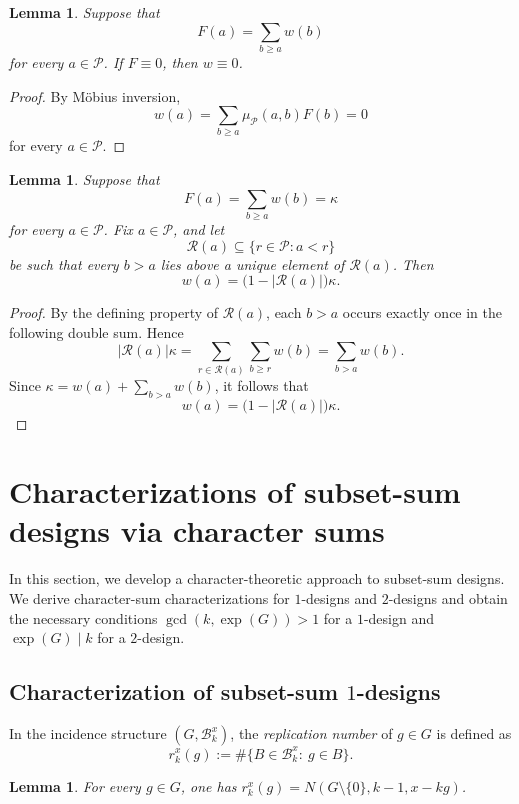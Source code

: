 \documentclass[11pt]{article}
\newtheorem{lemma}[theorem]{Lemma}
\theoremstyle{definition}
\newcommand{\cB}{\mathcal B}
\begin{document}
\begin{lemma}\label{lem:zeta-inversion}
	Suppose that
	$$
	F(a)=\sum_{b\ge a}w(b)
	$$
	for every $a\in\mathcal P$. If $F\equiv0$, then $w\equiv0$.
\end{lemma}

\begin{proof}
	By M\"obius inversion,
	$$
	w(a)
	=
	\sum_{b\ge a}\mu_{\mathcal P}(a,b)F(b)
	=
	0
	$$
	for every $a\in\mathcal P$.
\end{proof}

\begin{lemma}\label{lem:one-step-zeta-identity}
	Suppose that
	$$
	F(a)=\sum_{b\ge a}w(b)=\kappa
	$$
	for every $a\in\mathcal P$. Fix $a\in\mathcal P$, and let
	$$
	\mathcal R(a)
	\subseteq
	\{r\in\mathcal P:a<r\}
	$$
	be such that every $b>a$ lies above a unique element of
	$\mathcal R(a)$. Then
	$$
	w(a)
	=
	\bigl(1-|\mathcal R(a)|\bigr)\kappa.
	$$
\end{lemma}

\begin{proof}
	By the defining property of $\mathcal R(a)$, each $b>a$ occurs exactly
	once in the following double sum. Hence
	$$
	|\mathcal R(a)|\kappa
	=
	\sum_{r\in\mathcal R(a)}
	\sum_{b\ge r}w(b)
	=
	\sum_{b>a}w(b).
	$$
	Since $\kappa
	=
	w(a)+\sum_{b>a}w(b)$, it follows that
	$$
	w(a)
	=
	\bigl(1-|\mathcal R(a)|\bigr)\kappa.
	$$
\end{proof}



\section{Characterizations of subset-sum designs via character sums}
\label{sec:characters-subset-sums}

In this section, we develop a character-theoretic approach to subset-sum designs. We derive character-sum characterizations for $1$-designs and $2$-designs and obtain the necessary conditions $\gcd(k,\exp(G))>1$ for a $1$-design and $\exp(G)\mid k$ for a $2$-design. 

\subsection{Characterization of subset-sum \texorpdfstring{$1$}{1}-designs}
In the incidence structure \((G,\cB_k^x)\), the \emph{replication number}
of \(g\in G\) is defined as
$$r_{k}^{x}(g):=\#\{B\in\cB_k^x:\ g\in B\}.$$

\begin{lemma}\label{lem:punctured-subset-count}
	For every \(g\in G\), one has $r_k^x(g)=N(G\setminus\{0\},k-1,x-kg)$.
\end{lemma}
\end{document}
